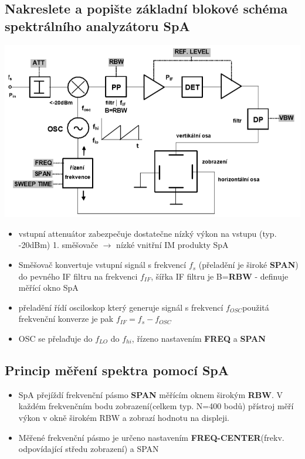 \documentclass[a4paper,czech]{article}
\begin{document}
\subsection{\textbf{Nakreslete a popište základní blokové schéma spektrálního analyzátoru SpA}}
\includegraphics[width=\textwidth,keepaspectratio]{images/SpA.png}
\begin{itemize}
	\item vstupní attenuátor zabezpečuje dostatečne nízký výkon na vstupu (typ. -20dBm) 1. směšovače $\to$ nízké vnitřní IM produkty SpA
	\item Směšovač konvertuje vstupní signál s frekvencí $f_s$ (přeladění je široké \textbf{SPAN}) do pevného IF filtru na frekvenci $f_{IF}$, šířka IF filtru je B=\textbf{RBW} - definuje měřící okno SpA
	\item přeladění řídí osciloskop který generuje signál s frekvencí $f_{OSC}$použitá frekvenční konverze je pak $f_{IF} = f_s-f_{OSC}$
	\item OSC se přelaďuje do $f_{LO}$ do $f_{hi}$, řízeno nastavením \textbf{FREQ} a \textbf{SPAN}
\end{itemize}
\subsection{\textbf{Princip měření spektra pomocí SpA}}
\begin{itemize}
	\item SpA přejíždí frekvenční pásmo \textbf{SPAN} měřícím oknem širokým \textbf{RBW}. V každém frekvenčním bodu zobrazení(celkem typ. N=400 bodů) přístroj měří výkon v okně širokém RBW a zobrazí hodnotu na displeji.
	\item Měřené frekvenční pásmo je určeno nastavením \textbf{FREQ-CENTER}(frekv. odpovídající středu zobrazení) a SPAN 
\end{itemize}
\end{document}
